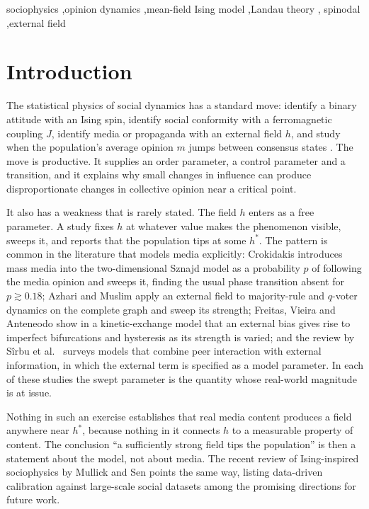 \documentclass[preprint,12pt]{elsarticle}
\begin{document}
\begin{frontmatter}
\begin{keyword}
sociophysics \sep opinion dynamics \sep mean-field Ising model \sep Landau theory \sep
spinodal \sep external field
\end{keyword}

\end{frontmatter}

\section{Introduction}
\label{sec:intro}

The statistical physics of social dynamics has a standard move: identify a binary attitude
with an Ising spin, identify social conformity with a ferromagnetic coupling $J$, identify
media or propaganda with an external field $h$, and study when the population's average
opinion $m$ jumps between consensus states
\cite{castellano2009,galam2008,sznajd2000,stauffer2008}. The move is
productive. It supplies an order parameter, a control parameter and a transition, and it
explains why small changes in influence can produce disproportionate changes in collective
opinion near a critical point.

It also has a weakness that is rarely stated. The field $h$ enters as a free parameter. A
study fixes $h$ at whatever value makes the phenomenon visible, sweeps it, and reports that
the population tips at some $h^\ast$. The pattern is common in the literature that
models media explicitly: Crokidakis \cite{crokidakis2012} introduces mass media into the
two-dimensional Sznajd model as a probability $p$ of following the media opinion and sweeps
it, finding the usual phase transition absent for $p \gtrsim 0.18$; Azhari and
Muslim \cite{azhari2023} apply an external field to majority-rule and $q$-voter dynamics on
the complete graph and sweep its strength; Freitas, Vieira and Anteneodo \cite{freitas2020}
show in a kinetic-exchange model that an external bias gives rise to imperfect bifurcations
and hysteresis as its strength is varied; and the review by S\^{i}rbu et al.\ \cite{sirbu2016}
surveys models that combine peer interaction with external information, in which the external
term is specified as a model parameter. In each of these studies the swept parameter is the
quantity whose real-world magnitude is at issue.

Nothing in such an exercise establishes that real media content produces a field anywhere
near $h^\ast$, because nothing in it connects $h$ to a measurable property of content. The
conclusion ``a sufficiently strong field tips the population'' is then a statement about the
model, not about media. The recent review of Ising-inspired sociophysics by Mullick and
Sen \cite{mullick2025} points the same way, listing data-driven calibration against
large-scale social datasets among the promising directions for future work.
\end{document}
